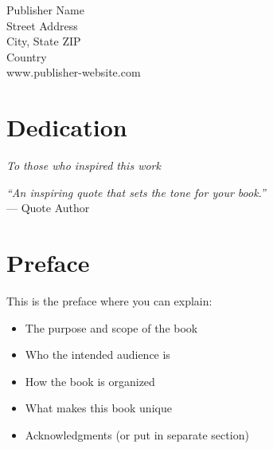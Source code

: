 \documentclass[11pt,a4paper,oneside]{book}
\begin{document}
\noindent
Publisher Name\\
Street Address\\
City, State ZIP\\
Country\\
www.publisher-website.com


\frontmatter

\chapter*{Dedication}

\vspace{2cm}
\begin{center}
    \textit{To those who inspired this work}
\end{center}

\cleardoublepage
\thispagestyle{empty}
\vspace*{5cm}
\begin{center}
    \Large\textit{``An inspiring quote that sets the tone for your book.''}\\[1cm]
    \normalsize --- Quote Author
\end{center}

\tableofcontents

\listoffigures

\listoftables

\chapter{Preface}

This is the preface where you can explain:
\begin{itemize}
    \item The purpose and scope of the book
    \item Who the intended audience is
    \item How the book is organized
    \item What makes this book unique
    \item Acknowledgments (or put in separate section)
\end{itemize}

\end{document}
